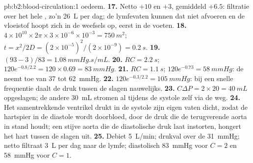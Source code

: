 \begin{solution}{pb:b2:blood-circulation:1}
oedeem.
\textbf{17.} Netto $+10$ en $+3$, gemiddeld $+6.5$: filtratie over het hele
, zo'n \qty{26}{L} per dag; de lymfevaten kunnen dat niet afvoeren en
de vloeistof hoopt zich in de weefsels op, eerst in de voeten.
\textbf{18.} $4\times 10^{10}\times 2\pi\times 3\times 10^{-6}\times
10^{-3} = \qty{750}{m^2}$; $t = x^{2}/2D = (2\times 10^{-5})^{2}/
(2\times 10^{-9}) = \qty{0.2}{s}$.
\textbf{19.} $(93 - 3)/83 = \qty{1.08}{mmHg.s/mL}$.
\textbf{20.} $RC = \qty{2.2}{s}$; $120e^{-0.8/2.2} = 120\times 0.69 =
\qty{83}{mmHg}$.
\textbf{21.} $RC = \qty{1.1}{s}$; $120e^{-0.73} = \qty{58}{mmHg}$: de
 neemt toe van 37 tot \qty{62}{mmHg}.
\textbf{22.} $120e^{-0.3/2.2} = \qty{105}{mmHg}$: bij een snelle frequentie
daalt de druk tussen de slagen nauwelijks.
\textbf{23.} $C\Delta P = 2\times 20 = \qty{40}{mL}$ opgeslagen; de andere
\qty{30}{mL} stromen al tijdens de systole zelf via de  weg.
\textbf{24.} Het samentrekkende ventrikel drukt in de systole zijn eigen vaten
dicht, zodat de hartspier in de diastole wordt doorbloed, door de druk die de
terugverende aorta in stand houdt; een stijve aorta die de diastolische druk
laat instorten, hongert het hart tussen de slagen uit.
\textbf{25.} Debiet \qty{5}{L/min}; drukval over de  \qty{31}{mmHg};
netto filtraat \qty{3}{L} per dag naar de lymfe; diastolisch \qty{83}{mmHg}
voor $C = 2$ en \qty{58}{mmHg} voor $C = 1$.
\end{solution}
